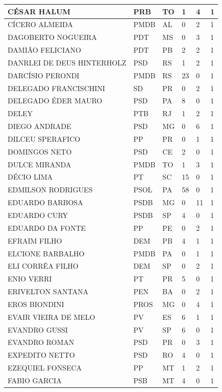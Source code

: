 \begin{apendicesenv}
\begin{longtable}{|L{4cm}|C{2cm}|C{1cm}|C{2cm}|C{1cm}|C{2cm}|}
CÉSAR HALUM & PRB & TO & 1 & 4 & 1 \\ \hline
CÍCERO ALMEIDA & PMDB & AL & 0 & 2 & 1 \\ \hline
DAGOBERTO NOGUEIRA & PDT & MS & 0 & 3 & 1 \\ \hline
DAMIÃO FELICIANO & PDT & PB & 2 & 2 & 1 \\ \hline
DANRLEI DE DEUS HINTERHOLZ & PSD & RS & 1 & 2 & 1 \\ \hline
DARCÍSIO PERONDI & PMDB & RS & 23 & 0 & 1 \\ \hline
DELEGADO FRANCISCHINI & SD & PR & 0 & 2 & 1 \\ \hline
DELEGADO ÉDER MAURO & PSD & PA & 8 & 0 & 1 \\ \hline
DELEY & PTB & RJ & 1 & 2 & 1 \\ \hline
DIEGO ANDRADE & PSD & MG & 0 & 6 & 1 \\ \hline
DILCEU SPERAFICO & PP & PR & 0 & 1 & 1 \\ \hline
DOMINGOS NETO & PSD & CE & 2 & 0 & 1 \\ \hline
DULCE MIRANDA & PMDB & TO & 1 & 3 & 1 \\ \hline
DÉCIO LIMA & PT & SC & 15 & 0 & 1 \\ \hline
EDMILSON RODRIGUES & PSOL & PA & 58 & 0 & 1 \\ \hline
EDUARDO BARBOSA & PSDB & MG & 0 & 11 & 1 \\ \hline
EDUARDO CURY & PSDB & SP & 4 & 0 & 1 \\ \hline
EDUARDO DA FONTE & PP & PE & 0 & 2 & 1 \\ \hline
EFRAIM FILHO & DEM & PB & 4 & 1 & 1 \\ \hline
ELCIONE BARBALHO & PMDB & PA & 0 & 1 & 1 \\ \hline
ELI CORRÊA FILHO & DEM & SP & 0 & 2 & 1 \\ \hline
ENIO VERRI & PT & PR & 5 & 0 & 1 \\ \hline
ERIVELTON SANTANA & PEN & BA & 0 & 2 & 1 \\ \hline
EROS BIONDINI & PROS & MG & 0 & 4 & 1 \\ \hline
EVAIR VIEIRA DE MELO & PV & ES & 6 & 1 & 1 \\ \hline
EVANDRO GUSSI & PV & SP & 6 & 0 & 1 \\ \hline
EVANDRO ROMAN & PSD & PR & 0 & 3 & 1 \\ \hline
EXPEDITO NETTO & PSD & RO & 4 & 0 & 1 \\ \hline
EZEQUIEL FONSECA & PP & MT & 1 & 2 & 1 \\ \hline
FABIO GARCIA & PSB & MT & 4 & 0 & 1 \\ \hline

\end{longtable}
\end{apendicesenv}

